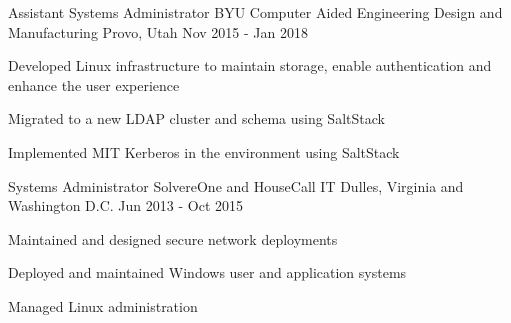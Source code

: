 \begin{cventries}
    \cventry
    {Assistant Systems Administrator} %
    {BYU Computer Aided Engineering Design and Manufacturing} %
    {Provo, Utah} %
    {Nov 2015 - Jan 2018} %
    {
        \begin{cvitems} %
        \item {Developed Linux infrastructure to maintain storage, enable authentication and enhance the user experience}
        \item {Migrated to a new LDAP cluster and schema using SaltStack}
        \item {Implemented MIT Kerberos in the environment using SaltStack}
        \end{cvitems}
    }

    \cventry
    {Systems Administrator} %
    {SolvereOne and HouseCall IT} %
    {Dulles, Virginia and Washington D.C.} %
    {Jun 2013 - Oct 2015} %
    {
        \begin{cvitems} %
        \item {Maintained and designed secure network deployments}
        \item {Deployed and maintained Windows user and application systems}
        \item {Managed Linux administration}
        \end{cvitems}
    }

\end{cventries}
